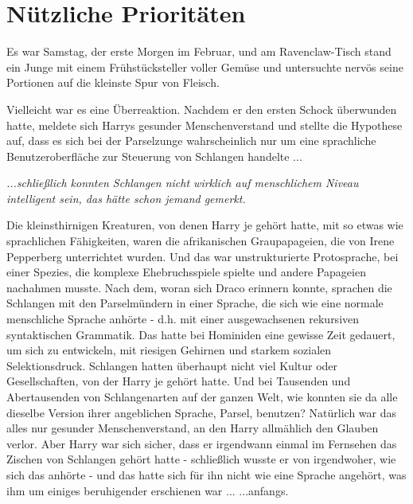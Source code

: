 \chapter{Nützliche Prioritäten}

Es war Samstag, der erste Morgen im Februar, und am Ravenclaw-Tisch stand ein
Junge mit einem Frühstücksteller voller Gemüse und untersuchte nervös seine
Portionen auf die kleinste Spur von Fleisch.

Vielleicht war es eine Überreaktion. Nachdem er den ersten Schock überwunden
hatte, meldete sich Harrys gesunder Menschenverstand und stellte die Hypothese
auf, dass es sich bei der \glqq{}Parselzunge\grqq{} wahrscheinlich nur um eine
sprachliche Benutzeroberfläche zur Steuerung von Schlangen handelte ...

\emph{...schließlich konnten Schlangen nicht wirklich auf menschlichem Niveau
intelligent sein, das hätte schon jemand gemerkt.}

Die kleinsthirnigen Kreaturen, von denen Harry je gehört hatte, mit so etwas wie
sprachlichen Fähigkeiten, waren die afrikanischen Graupapageien, die von Irene
Pepperberg unterrichtet wurden. Und das war unstrukturierte Protosprache, bei
einer Spezies, die komplexe Ehebruchsspiele spielte und andere Papageien
nachahmen musste. Nach dem, woran sich Draco erinnern konnte, sprachen die
Schlangen mit den Parselmündern in einer Sprache, die sich wie eine normale
menschliche Sprache anhörte - d.h. mit einer ausgewachsenen rekursiven
syntaktischen Grammatik. Das hatte bei Hominiden eine gewisse Zeit gedauert, um
sich zu entwickeln, mit riesigen Gehirnen und starkem sozialen Selektionsdruck.
Schlangen hatten überhaupt nicht viel Kultur oder Gesellschaften, von der Harry
je gehört hatte. Und bei Tausenden und Abertausenden von Schlangenarten auf der
ganzen Welt, wie konnten sie da alle dieselbe Version ihrer angeblichen Sprache,
\glqq{}Parsel\grqq{}, benutzen? Natürlich war das alles nur gesunder
Menschenverstand, an den Harry allmählich den Glauben verlor. Aber Harry war
sich sicher, dass er irgendwann einmal im Fernsehen das Zischen von Schlangen
gehört hatte - schließlich wusste er von irgendwoher, wie sich das anhörte - und
das hatte sich für ihn nicht wie eine Sprache angehört, was ihm um einiges
beruhigender erschienen war ... ...anfangs.

